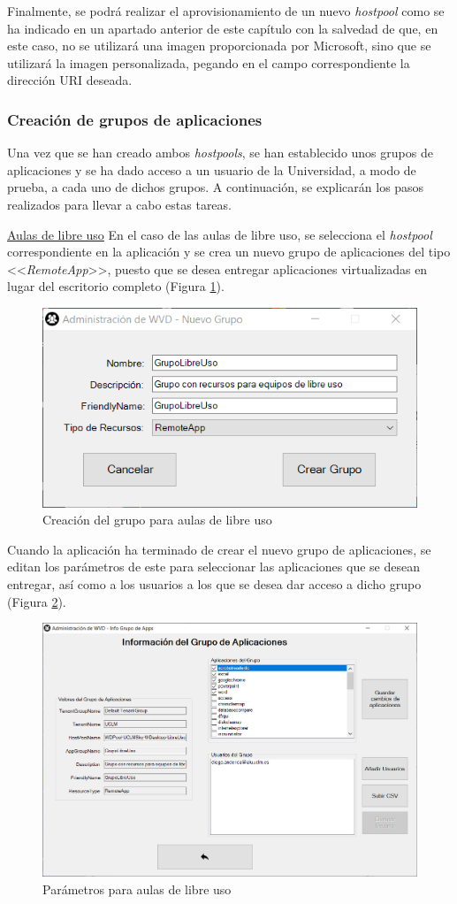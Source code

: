 Finalmente, se podrá realizar el aprovisionamiento de un nuevo \textit{hostpool} como se ha indicado en un apartado anterior de este capítulo con la salvedad de que, en este caso, no se utilizará una imagen proporcionada por Microsoft, sino que se utilizará la imagen personalizada, pegando en el campo correspondiente la dirección \acs{URI} deseada.

\subsubsection{Creación de grupos de aplicaciones}
Una vez que se han creado ambos \textit{hostpools}, se han establecido unos grupos de aplicaciones y se ha dado acceso a un usuario de la Universidad, a modo de prueba, a cada uno de dichos grupos. A continuación, se explicarán los pasos realizados para llevar a cabo estas tareas.

\noindent\underline{Aulas de libre uso}\newline
\indent En el caso de las aulas de libre uso, se selecciona el \textit{hostpool} correspondiente en la aplicación y se crea un nuevo grupo de aplicaciones del tipo <<\textit{RemoteApp}>>, puesto que se desea entregar aplicaciones virtualizadas en lugar del escritorio completo (Figura \ref{fig:cg_alu}).

\begin{figure}[h]
  \centering
  \includegraphics[width=0.5\linewidth]{figures/images/casos_uso/creacion_grupo_alu.PNG}
  \caption{Creación del grupo para aulas de libre uso}
  \label{fig:cg_alu}
\end{figure}

Cuando la aplicación ha terminado de crear el nuevo grupo de aplicaciones, se editan los parámetros de este para seleccionar las aplicaciones que se desean entregar, así como a los usuarios a los que se desea dar acceso a dicho grupo (Figura \ref{fig:params_alu}).

\begin{figure}[h]
  \centering
  \includegraphics[width=0.8\linewidth]{figures/images/casos_uso/params_alu.PNG}
  \caption{Parámetros para aulas de libre uso}
  \label{fig:params_alu}
\end{figure}

